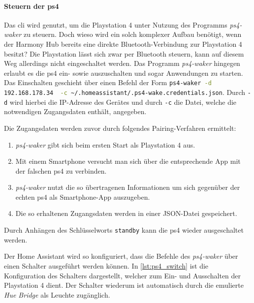\paragraph{Steuern der \ac{ps4}}
Das \ac{cli} wird genutzt, um die Playstation 4 unter Nutzung des Programms \textit{ps4-waker} \cite{dhleongp12:online} zu steuern.
Doch wieso wird ein solch komplexer Aufbau benötigt, wenn der Harmony Hub bereits eine direkte Bluetooth-Verbindung zur Playstation 4 besitzt?
Die Playstation lässt sich zwar per Bluetooth steuern,
kann auf diesem Weg allerdings nicht eingeschaltet werden.
Das Programm \textit{ps4-waker} hingegen erlaubt es die \ac{ps4} ein- sowie auszuschalten und sogar Anwendungen zu starten.
Das Einschalten geschieht über einen Befehl der Form \lstinline[language=bash]{ps4-waker -d 192.168.178.34  -c ~/.homeassistant/.ps4-wake.credentials.json}.
Durch \lstinline[language=bash]{-d} wird hierbei die IP-Adresse des Gerätes und
durch \lstinline[language=bash]{-c} die Datei,
welche die notwendigen Zugangsdaten enthält, angegeben.

Die Zugangsdaten werden zuvor durch folgendes Pairing-Verfahren ermittelt:
\begin{enumerate}
    \setlength\itemsep{-0.5em}
    \item \textit{ps4-waker} gibt sich beim ersten Start als Playstation 4 aus.
    \item Mit einem Smartphone versucht man sich über die entsprechende App mit der falschen \ac{ps4} zu verbinden.
    \item \textit{ps4-waker} nutzt die so übertragenen Informationen um sich gegenüber der echten \ac{ps4} als Smartphone-App auszugeben.
    \item Die so erhaltenen Zugangsdaten werden in einer JSON-Datei gespeichert.
\end{enumerate}

Durch Anhängen des Schlüsselworts \lstinline[language=bash]{standby} kann die
\ac{ps4} wieder ausgeschaltet werden.

Der Home Assistant wird so konfiguriert,
dass die Befehle des \textit{ps4-waker} über einen Schalter ausgeführt werden können.
In \autoref{lst:ps4_switch} ist die Konfiguration des Schalters dargestellt,
welcher zum Ein- und Ausschalten der Playstation 4 dient.
Der Schalter wiederum ist automatisch durch die emulierte \textit{Hue Bridge} als Leuchte zugänglich.



